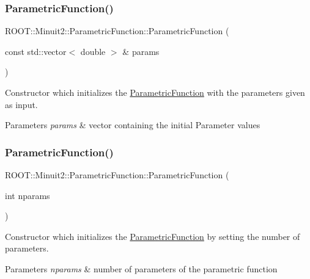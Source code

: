 \subsubsection{\texorpdfstring{ParametricFunction()}{ParametricFunction()}\hspace{0.1cm}{\footnotesize\ttfamily [1/4]}}
{\footnotesize\ttfamily R\+O\+O\+T\+::\+Minuit2\+::\+Parametric\+Function\+::\+Parametric\+Function (\begin{DoxyParamCaption}\item[{const std\+::vector$<$ double $>$ \&}]{params }\end{DoxyParamCaption})\hspace{0.3cm}{\ttfamily [inline]}}

Constructor which initializes the \mbox{\hyperlink{classROOT_1_1Minuit2_1_1ParametricFunction}{Parametric\+Function}} with the parameters given as input.


\begin{DoxyParams}{Parameters}
{\em params} & vector containing the initial Parameter values \\
\hline
\end{DoxyParams}
\mbox{\label{classROOT_1_1Minuit2_1_1ParametricFunction_a0b8e823b3a61fc0f20ffe419e0fa1e1a}} 
\subsubsection{\texorpdfstring{ParametricFunction()}{ParametricFunction()}\hspace{0.1cm}{\footnotesize\ttfamily [2/4]}}
{\footnotesize\ttfamily R\+O\+O\+T\+::\+Minuit2\+::\+Parametric\+Function\+::\+Parametric\+Function (\begin{DoxyParamCaption}\item[{int}]{nparams }\end{DoxyParamCaption})\hspace{0.3cm}{\ttfamily [inline]}}

Constructor which initializes the \mbox{\hyperlink{classROOT_1_1Minuit2_1_1ParametricFunction}{Parametric\+Function}} by setting the number of parameters.


\begin{DoxyParams}{Parameters}
{\em nparams} & number of parameters of the parametric function \\
\hline
\end{DoxyParams}
\mbox{\label{classROOT_1_1Minuit2_1_1ParametricFunction_a18aae731e634b4fc1c79403d8f49caa9}} 
